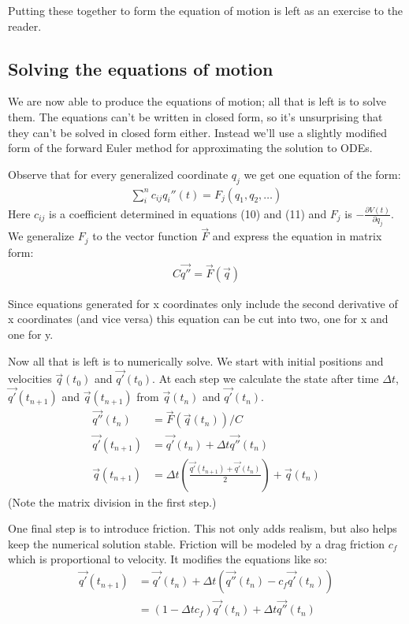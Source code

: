 \documentclass{article}
\begin{document}
Putting these together to form the equation of motion is left as an exercise to
the reader.
\subsection{Solving the equations of motion}
We are now able to produce the equations of motion; all that is left is to solve
them. The equations can't be written in closed form, so it's unsurprising that
they can't be solved in closed form either. Instead we'll use a slightly
modified form of the forward Euler method for approximating the solution to ODEs.

Observe that for every generalized coordinate $q_j$ we get one equation of the
form:
\begin{align*}
\sum_i^n c_{ij}q_i''(t) = F_j(q_1,q_2,\ldots)
\end{align*}
Here $c_{ij}$ is a coefficient determined in equations (10) and (11) and $F_j$
is $-\frac{\partial V(t)}{\partial q_j}$. We generalize $F_j$ to the vector
function $\vec{F}$ and express the equation in matrix form:
\begin{align*}
C \vec{q''}= \vec{F}(\vec{q})
\end{align*}

Since equations generated for x coordinates only include the second derivative
of x coordinates (and vice versa) this equation can be cut into two, one for x
and one for y.

Now all that is left is to numerically solve. We start with initial positions
and velocities $\vec{q}(t_0)$ and $\vec{q'}(t_0)$. At each step we calculate the
state after time $\Delta t$,  $\vec{q'}(t_{n+1})$ and $\vec{q}(t_{n+1})$ from
$\vec{q}(t_n)$ and $\vec{q'}(t_n)$.
\begin{align*}
\vec{q''}(t_n) &= \vec{F}(\vec{q}(t_n)) / C\\
\vec{q'}(t_{n+1}) &= \vec{q'}(t_n)+\Delta t \vec{q''}(t_n)\\
\vec{q}(t_{n+1}) &= \Delta t \left( \frac{\vec{q'}(t_{n+1}) + \vec{q'}(t_n)}{2}
\right)+ \vec{q}(t_n)
\end{align*}
(Note the matrix division in the first step.)

One final step is to introduce friction. This not only adds realism, but also
helps keep the numerical solution stable. Friction will be modeled by
a drag friction $c_f$ which is proportional to velocity. It modifies the
equations like so:
\begin{align*}
\vec{q'}(t_{n+1}) &= \vec{q'}(t_n)+\Delta t \left(\vec{q''}(t_n)
-c_f\vec{q'}(t_n)\right)\\
&= \left(1-\Delta t c_f\right)\vec{q'}(t_n)+\Delta t \vec{q''}(t_n)
\end{align*}
\end{document}
